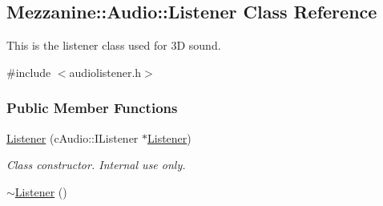 \hypertarget{classMezzanine_1_1Audio_1_1Listener}{
\subsection{Mezzanine::Audio::Listener Class Reference}
\label{classMezzanine_1_1Audio_1_1Listener}
}


This is the listener class used for 3D sound.  




{\ttfamily \#include $<$audiolistener.h$>$}

\subsubsection*{Public Member Functions}
\begin{DoxyCompactItemize}
\item 
\hyperlink{classMezzanine_1_1Audio_1_1Listener_a31804de89544d687005f4e8aa7373f79}{Listener} (cAudio::IListener $\ast$\hyperlink{classMezzanine_1_1Audio_1_1Listener}{Listener})
\begin{DoxyCompactList}\small\item\em Class constructor. Internal use only. \item\end{DoxyCompactList}\item 
\hypertarget{classMezzanine_1_1Audio_1_1Listener_a443af89e23007cb1c96acb1fe297ff9c}{
\hyperlink{classMezzanine_1_1Audio_1_1Listener_a443af89e23007cb1c96acb1fe297ff9c}{$\sim$Listener} ()}
\label{classMezzanine_1_1Audio_1_1Listener_a443af89e23007cb1c96acb1fe297ff9c}


\end{DoxyCompactItemize}
